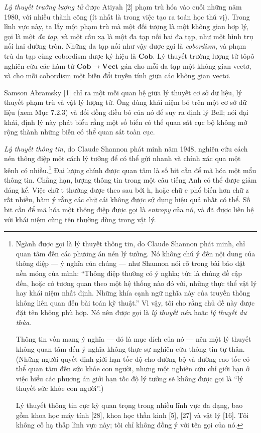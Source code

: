 \emph{Lý thuyết trường lượng tử} được Atiyah [2] phạm trù hóa vào cuối những năm 1980, với nhiều thành công (ít nhất là trong việc tạo ra toán học thú vị). Trong lĩnh vực này, ta lấy một phạm trù mà một đối tượng là một không gian hợp lý, gọi là một \emph{đa tạp}, và một cấu xạ là một
đa tạp nối hai đa tạp, như một hình trụ nối hai đường tròn. Những đa tạp nối như vậy được gọi là \emph{cobordism}, và phạm trù đa tạp cùng cobordism được ký hiệu là $\mathbf{Cob}$. Lý thuyết trường lượng tử tôpô nghiên cứu các hàm tử $\mathbf{Cob}\to\mathbf{Vect}$ gán cho mỗi đa tạp một không gian vectơ, và cho mỗi cobordism một biến đổi tuyến tính giữa các không gian vectơ.

Samson Abramsky [1] chỉ ra một mối quan hệ giữa lý thuyết cơ sở dữ liệu, lý thuyết phạm trù và vật lý lượng tử. Ông dùng khái niệm bó trên một cơ sở dữ liệu (xem Mục 7.2.3) và đối đồng điều bó của nó để suy ra định lý Bell; nói đại khái, định lý này phát biểu rằng một số biến có thể quan sát cục bộ không mở rộng thành những biến có thể quan sát toàn cục.

\emph{Lý thuyết thông tin}, do Claude Shannon phát minh năm 1948, nghiên cứu cách nén thông điệp một cách lý tưởng để có thể gửi nhanh và chính xác qua một kênh có nhiễu.\footnote{Ngành được gọi là lý thuyết thông tin, do Claude Shannon phát minh, chỉ quan tâm đến các phương án nén lý tưởng. Nó không chú ý đến nội dung của thông điệp --- ý nghĩa của chúng --- như Shannon nói rõ trong bài báo đặt nền móng của mình: ``Thông điệp thường có ý nghĩa; tức là chúng đề cập đến, hoặc có tương quan theo một hệ thống nào đó với, những thực thể vật lý hay khái niệm nhất định. Những khía cạnh ngữ nghĩa này của truyền thông không liên quan đến bài toán kỹ thuật.'' Vì vậy, tôi cho rằng chủ đề này được đặt tên không phù hợp. Nó nên được gọi là \emph{lý thuyết nén} hoặc \emph{lý thuyết dư thừa}.

Thông tin vốn mang ý nghĩa --- đó là mục đích của nó --- nên một lý thuyết không quan tâm đến ý nghĩa không thực sự nghiên cứu thông tin tự thân. (Những người quyết định giới hạn tốc độ cho đường bộ và đường cao tốc có thể quan tâm đến sức khỏe con người, nhưng một nghiên cứu chỉ giới hạn ở việc hiểu các phương án giới hạn tốc độ lý tưởng sẽ không được gọi là ``lý thuyết sức khỏe con người''.)

Lý thuyết thông tin cực kỳ quan trọng trong nhiều lĩnh vực đa dạng, bao gồm khoa học máy tính [28], khoa học thần kinh [5], [27] và vật lý [16]. Tôi không cố hạ thấp lĩnh vực này; tôi chỉ không đồng ý với tên gọi của nó.} Đại lượng chính được quan tâm là số bit cần để mã hóa một mẩu thông tin. Chẳng hạn, lượng thông tin trong một câu tiếng Anh có thể được giảm đáng kể. Việc chữ t thường được theo sau bởi h, hoặc chữ e phổ biến hơn chữ z rất nhiều, hàm ý rằng các chữ cái không được sử dụng hiệu quả nhất có thể. Số bit cần để mã hóa một thông điệp được gọi là \emph{entropy} của nó, và đã được liên hệ với khái niệm cùng tên thường dùng trong vật lý.


